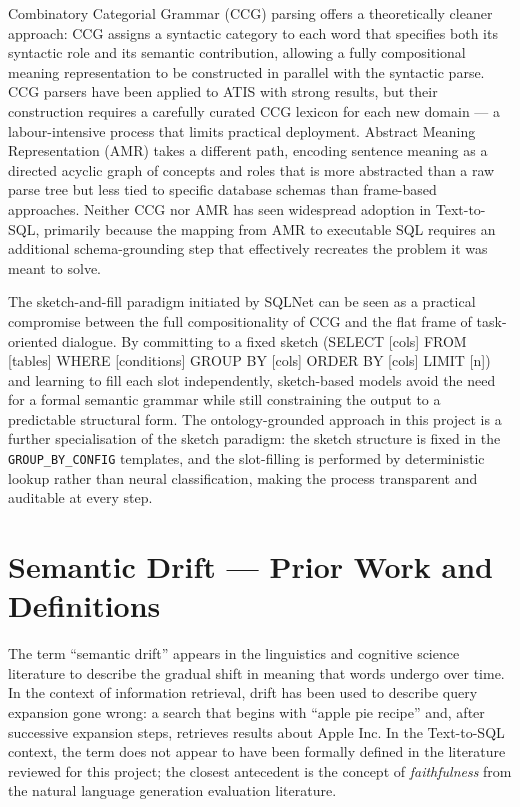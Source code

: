 \documentclass[12pt,a4paper]{report}
\begin{document}
Combinatory Categorial Grammar (CCG) parsing offers a theoretically cleaner approach: CCG assigns a syntactic category to each word that specifies both its syntactic role and its semantic contribution, allowing a fully compositional meaning representation to be constructed in parallel with the syntactic parse. CCG parsers have been applied to ATIS with strong results, but their construction requires a carefully curated CCG lexicon for each new domain — a labour-intensive process that limits practical deployment. Abstract Meaning Representation (AMR) takes a different path, encoding sentence meaning as a directed acyclic graph of concepts and roles that is more abstracted than a raw parse tree but less tied to specific database schemas than frame-based approaches. Neither CCG nor AMR has seen widespread adoption in Text-to-SQL, primarily because the mapping from AMR to executable \ac{SQL} requires an additional schema-grounding step that effectively recreates the problem it was meant to solve.

The sketch-and-fill paradigm initiated by SQLNet can be seen as a practical compromise between the full compositionality of CCG and the flat frame of task-oriented dialogue. By committing to a fixed sketch (SELECT [cols] FROM [tables] WHERE [conditions] GROUP BY [cols] ORDER BY [cols] LIMIT [n]) and learning to fill each slot independently, sketch-based models avoid the need for a formal semantic grammar while still constraining the output to a predictable structural form. The ontology-grounded approach in this project is a further specialisation of the sketch paradigm: the sketch structure is fixed in the \texttt{GROUP\_BY\_CONFIG} templates, and the slot-filling is performed by deterministic lookup rather than neural classification, making the process transparent and auditable at every step.

\section{Semantic Drift --- Prior Work and Definitions}
\label{sec:drift-prior-work}

The term ``semantic drift'' appears in the linguistics and cognitive science literature to describe the gradual shift in meaning that words undergo over time. In the context of information retrieval, drift has been used to describe query expansion gone wrong: a search that begins with ``apple pie recipe'' and, after successive expansion steps, retrieves results about Apple Inc. In the Text-to-SQL context, the term does not appear to have been formally defined in the literature reviewed for this project; the closest antecedent is the concept of \textit{faithfulness} from the natural language generation evaluation literature.
\end{document}
